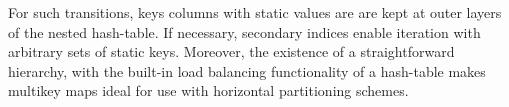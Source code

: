 For such transitions, keys columns with static values are are kept at outer layers of the nested hash-table.  If necessary, secondary indices enable iteration with arbitrary sets of static keys.  Moreover, the existence of a straightforward hierarchy, with the built-in load balancing functionality of a hash-table makes multikey maps ideal for use with horizontal partitioning schemes.


%
%
%
%
%
%
%
